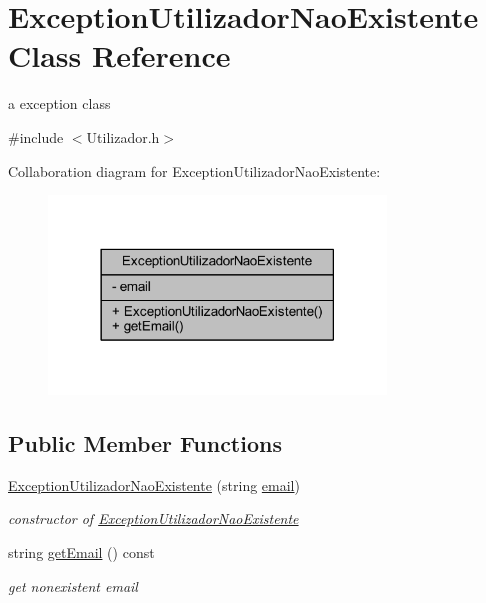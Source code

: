 \hypertarget{class_exception_utilizador_nao_existente}{}\section{Exception\+Utilizador\+Nao\+Existente Class Reference}
\label{class_exception_utilizador_nao_existente}


a exception class  




{\ttfamily \#include $<$Utilizador.\+h$>$}



Collaboration diagram for Exception\+Utilizador\+Nao\+Existente\+:\nopagebreak
\begin{figure}[H]
\begin{center}
\leavevmode
\includegraphics[width=254pt]{class_exception_utilizador_nao_existente__coll__graph}
\end{center}
\end{figure}
\subsection*{Public Member Functions}
\begin{DoxyCompactItemize}
\item 
\hypertarget{class_exception_utilizador_nao_existente_ac2359fc696826f9b93fd13b4b7406d19}{}\hyperlink{class_exception_utilizador_nao_existente_ac2359fc696826f9b93fd13b4b7406d19}{Exception\+Utilizador\+Nao\+Existente} (string \hyperlink{class_exception_utilizador_nao_existente_a4e29231dbb3f22d7eff5abe95de52927}{email})\label{class_exception_utilizador_nao_existente_ac2359fc696826f9b93fd13b4b7406d19}

\begin{DoxyCompactList}\small\item\em constructor of \hyperlink{class_exception_utilizador_nao_existente}{Exception\+Utilizador\+Nao\+Existente} \end{DoxyCompactList}\item 
\hypertarget{class_exception_utilizador_nao_existente_a5d982324a98c8435b550fef08777b77b}{}string \hyperlink{class_exception_utilizador_nao_existente_a5d982324a98c8435b550fef08777b77b}{get\+Email} () const \label{class_exception_utilizador_nao_existente_a5d982324a98c8435b550fef08777b77b}

\begin{DoxyCompactList}\small\item\em get nonexistent email \end{DoxyCompactList}\end{DoxyCompactItemize}
